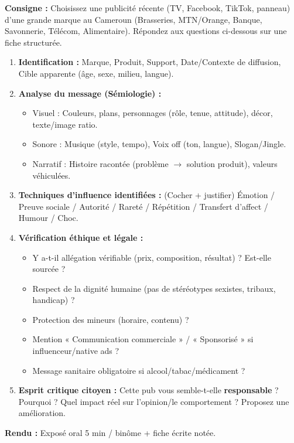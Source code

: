 \documentclass[11pt]{article}
\begin{document}
\begin{exercice}
\textbf{Consigne :} Choisissez une publicité récente (TV, Facebook, TikTok, panneau) d'une grande marque au Cameroun (Brasseries, MTN/Orange, Banque, Savonnerie, Télécom, Alimentaire). Répondez aux questions ci-dessous sur une fiche structurée.
\begin{enumerate}
    \item \textbf{Identification :} Marque, Produit, Support, Date/Contexte de diffusion, Cible apparente (âge, sexe, milieu, langue).
    \item \textbf{Analyse du message (Sémiologie) :} 
    \begin{itemize}
        \item Visuel : Couleurs, plans, personnages (rôle, tenue, attitude), décor, texte/image ratio.
        \item Sonore : Musique (style, tempo), Voix off (ton, langue), Slogan/Jingle.
        \item Narratif : Histoire racontée (problème $\rightarrow$ solution produit), valeurs véhiculées.
    \end{itemize}
    \item \textbf{Techniques d'influence identifiées :} (Cocher + justifier) Émotion / Preuve sociale / Autorité / Rareté / Répétition / Transfert d'affect / Humour / Choc.
    \item \textbf{Vérification éthique et légale :} 
    \begin{itemize}
        \item Y a-t-il allégation vérifiable (prix, composition, résultat) ? Est-elle sourcée ?
        \item Respect de la dignité humaine (pas de stéréotypes sexistes, tribaux, handicap) ?
        \item Protection des mineurs (horaire, contenu) ?
        \item Mention « Communication commerciale » / « Sponsorisé » si influenceur/native ads ?
        \item Message sanitaire obligatoire si alcool/tabac/médicament ?
    \end{itemize}
    \item \textbf{Esprit critique citoyen :} Cette pub vous semble-t-elle \textbf{responsable} ? Pourquoi ? Quel impact réel sur l'opinion/le comportement ? Proposez une amélioration.
\end{enumerate}
\textbf{Rendu :} Exposé oral 5 min / binôme + fiche écrite notée.
\end{exercice}
\end{document}
